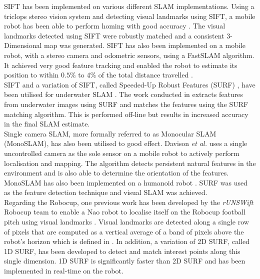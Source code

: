 \documentclass[11pt]{report}
\begin{document}
SIFT has been implemented on various different SLAM implementations. Using a triclops stereo vision system and detecting visual landmarks using SIFT, a mobile robot has been able to perform homing with good accuracy \cite{Se2001, Se2002}. The visual landmarks detected using SIFT were robustly matched and a consistent 3-Dimensional map was generated. SIFT has also been implemented on a mobile robot, with a stereo camera and odometric sensors, using a FastSLAM algorithm. It achieved very good feature tracking and enabled the robot to estimate its position to within $0.5\%$ to $4\%$ of the total distance travelled \cite{Barfoot2005}.\\

SIFT and a variation of SIFT, called Speeded-Up Robust Features (SURF) \cite{Bay2008}, have been utilised for underwater SLAM \cite{Aulinas2011, Thomas}. The work conducted in \cite{Aulinas} extracts features from underwater images using SURF and matches the features using the SURF matching algorithm. This is performed off-line but results in increased accuracy in the final SLAM estimate.\\

Single camera SLAM, more formally referred to as Monocular SLAM (MonoSLAM), has also been utilised to good effect. Davison \textit{et al.} \cite{Davison2007} uses a single uncontrolled camera as the sole sensor on a mobile robot to actively perform localisation and mapping. The algorithm detects persistent natural features in the environment and is also able to determine the orientation of the features. MonoSLAM has also been implemented on a humanoid robot \cite{Wang2011}. SURF was used as the feature detection technique and visual SLAM was achieved.\\

Regarding the Robocup, one previous work has been developed by the \textit{rUNSWift} Robocup team to enable a Nao robot to localise itself on the Robocup football pitch using visual landmarks \cite{Anderson}. Visual landmarks are detected along a single row of pixels that are computed as a vertical average of a band of pixels above the robot's horizon which is defined in \cite{Bhuman}. In addition, a variation of 2D SURF, called 1D SURF, has been developed to detect and match interest points along this single dimension. 1D SURF is significantly faster than 2D SURF and has been implemented in real-time on the robot.\\
\end{document}
